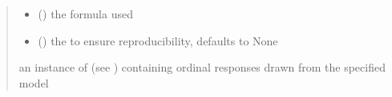 \documentclass[letterpaper,10pt,english]{sphinxmanual}
\begin{document}
\begin{fulllineitems}
\begin{quote}
\begin{description}
\begin{itemize}
\item {} 
\sphinxAtStartPar
{} () \textendash{} the formula used

\item {} 
\sphinxAtStartPar
{} (\sphinxstyleliteralemphasis{\sphinxupquote{, }}) \textendash{} the  to ensure reproducibility, defaults to None

\end{itemize}

\sphinxAtStartPar
an instance of  (see ) containing ordinal responses drawn from the specified model

\end{description}\end{quote}

\end{fulllineitems}

\end{document}
